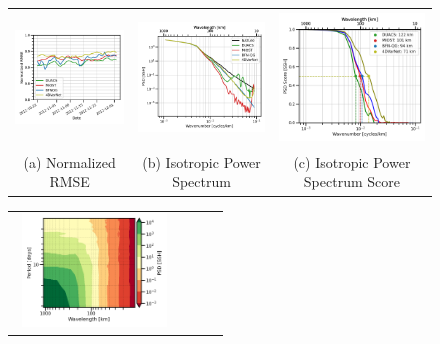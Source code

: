 \begin{figure}[t!]
\small
\begin{center}
\setlength{\tabcolsep}{2pt}
\begin{tabular}{ccc}
\includegraphics[width=3.75cm,height=3.25cm]{content/figures/stats/nrmse_space.png} &
\includegraphics[width=4.25cm,height=3.5cm]{content/figures/psd_isotropic/dc20a/nadir4/dc20a_psd_iso_ssh.png} &
\includegraphics[width=4.25cm,height=3.5cm]{content/figures/psd_isotropic/dc20a/nadir4/dc20a_psd_score_iso_ssh.png} 
\\
(a) Normalized RMSE &
(b) Isotropic Power Spectrum &
(c) Isotropic Power Spectrum Score
\end{tabular}
\begin{tabular}{cccc}
\includegraphics[trim={0 0 0mm 0},clip, width=4.20cm,height=3cm]{content/figures/psd_spacetime/dc20a/nadir4/dc20a_psd_spacetime_nemo_nadir4_ssh.png}  &

\end{tabular}
\end{center}
\end{figure}
